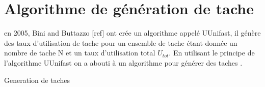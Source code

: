 \section{Algorithme de génération de tache}

en 2005, Bini and Buttazzo [ref] ont crée un algorithme appelé UUnifast, il génère des taux d'utilisation de tache pour un ensemble de tache étant donnée un nombre de tache N et un taux d'utilisation total $U_{tot}$.
En utilisant le principe de l'algorithme UUnifast on a abouti à un algorithme pour générer des taches .
\begin{center}
\begin{algorithm}[H]
 \caption{Generation de taches}
\end{algorithm}
\end{center}
